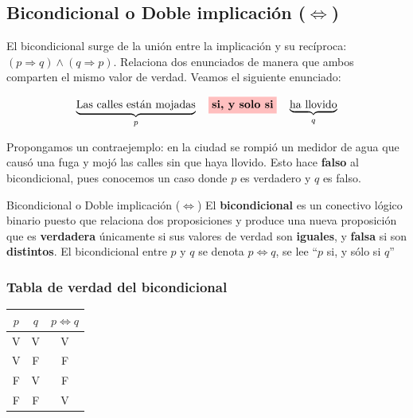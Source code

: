 \subsection{\texorpdfstring{Bicondicional o Doble implicación ($\Leftrightarrow$)}{Bicondicional}}

El bicondicional surge de la unión entre la implicación y su recíproca: $(p \Rightarrow q) \land (q \Rightarrow p)$. Relaciona dos enunciados de manera que ambos comparten el mismo valor de verdad. Veamos el siguiente enunciado:

\[
\underbrace{\text{Las calles están mojadas}}_{p}
\quad
\colorbox{red!25}{\textbf{si, y solo si}}
\quad
\underbrace{\text{ha llovido}}_{q}
\]

Propongamos un contraejemplo: en la ciudad se rompió un medidor de agua que causó una fuga y mojó las calles sin que haya llovido. Esto hace \textbf{falso} al bicondicional, pues conocemos un caso donde $p$ es verdadero y $q$ es falso.

\begin{dfn}{Bicondicional o Doble implicación ($\Leftrightarrow$)}
    El \textbf{bicondicional} es un conectivo lógico binario puesto que relaciona dos proposiciones y produce una nueva proposición que es \textbf{verdadera} únicamente si sus valores de verdad son \textbf{iguales}, y \textbf{falsa} si son \textbf{distintos}. El bicondicional entre $p$ y $q$ se denota $p \Leftrightarrow q$, se lee ``$p$ si, y sólo si $q$''
\end{dfn}

\subsubsection*{Tabla de verdad del bicondicional}
\begin{center}
    \renewcommand{\arraystretch}{1.4}
    \begin{tabular}{|c|c|c|}
        \hline
        \textbf{$p$} & \textbf{$q$} & \textbf{$p \Leftrightarrow q$} \\
        \hline
        V & V & V \\
        \hline
        V & F & F \\
        \hline
        F & V & F \\
        \hline
        F & F & V \\
        \hline
    \end{tabular}
\end{center}

